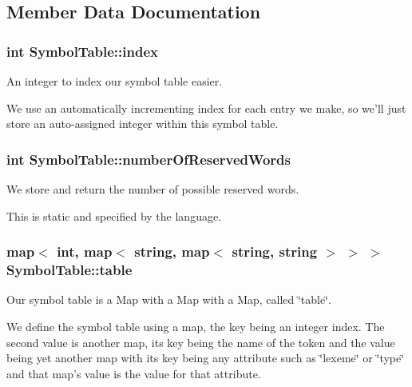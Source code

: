 \subsection{Member Data Documentation}
\hypertarget{classSymbolTable_a6e85689256b178941b87f51e570a6c1e}{
\subsubsection[{index}]{\setlength{\rightskip}{0pt plus 5cm}int {\bf SymbolTable::index}}}
\label{classSymbolTable_a6e85689256b178941b87f51e570a6c1e}


An integer to index our symbol table easier. 

We use an automatically incrementing index for each entry we make, so we'll just store an auto-\/assigned integer within this symbol table. \hypertarget{classSymbolTable_ac98627cea258b0931be5286aacb1f478}{
\subsubsection[{numberOfReservedWords}]{\setlength{\rightskip}{0pt plus 5cm}int {\bf SymbolTable::numberOfReservedWords}}}
\label{classSymbolTable_ac98627cea258b0931be5286aacb1f478}


We store and return the number of possible reserved words. 

This is static and specified by the language. \hypertarget{classSymbolTable_a96f585bb42df3aad2e833e95681f0727}{
\subsubsection[{table}]{\setlength{\rightskip}{0pt plus 5cm}map$<$ int, map$<$ string, map$<$ string, string $>$ $>$ $>$ {\bf SymbolTable::table}}}
\label{classSymbolTable_a96f585bb42df3aad2e833e95681f0727}


Our symbol table is a Map with a Map with a Map, called \char`\"{}table\char`\"{}. 

We define the symbol table using a map, the key being an integer index. The second value is another map, its key being the name of the token and the value being yet another map with its key being any attribute such as \char`\"{}lexeme\char`\"{} or \char`\"{}type\char`\"{} and that map's value is the value for that attribute.

